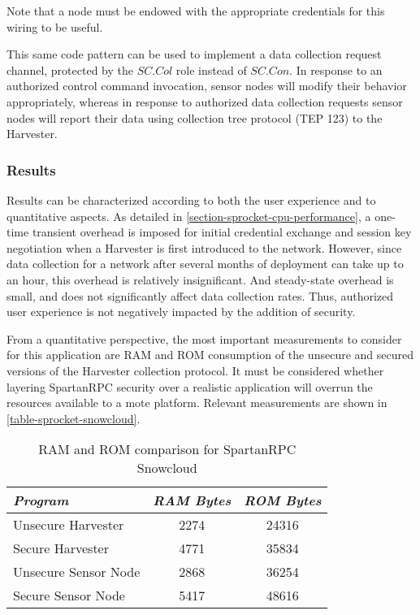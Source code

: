 Note that a node must be endowed with the appropriate credentials for this wiring to be useful.

This same code pattern can be used to implement a data collection request channel, protected by
the $\mathit{SC.Col}$ role instead of $\mathit{SC.Con}$. In response to an authorized control
command invocation, sensor nodes will modify their behavior appropriately, whereas in response
to authorized data collection requests sensor nodes will report their data using collection tree
protocol (TEP 123) to the Harvester.

\subsubsection{Results}

Results can be characterized according to both the user experience and to quantitative aspects.
As detailed in \autoref{section-sprocket-cpu-performance}, a one-time transient overhead is
imposed for initial credential exchange and session key negotiation when a Harvester is first
introduced to the network. However, since data collection for a network after several months of
deployment can take up to an hour, this overhead is relatively insignificant. And steady-state
overhead is small, and does not significantly affect data collection rates. Thus, authorized
user experience is not negatively impacted by the addition of security.

From a quantitative perspective, the most important measurements to consider for this
application are RAM and ROM consumption of the unsecure and secured versions of the Harvester
collection protocol. It must be considered whether layering SpartanRPC security over a realistic
application will overrun the resources available to a mote platform. Relevant measurements are
shown in \autoref{table-sprocket-snowcloud}.

\begin{table}[h]
\centering \newcommand\T{\rule{0pt}{2.1ex}}
\caption{RAM and ROM comparison for SpartanRPC Snowcloud} {
\begin{tabular}{|l|c|c|}
\hline
\emph{Program} \T       & \emph{RAM Bytes} & \emph{ROM Bytes} \\ \hline\hline
Unsecure Harvester \T   &             2274 &            24316 \\ \hline
Secure Harvester \T     &             4771 &            35834 \\ \hline
Unsecure Sensor Node \T &             2868 &            36254 \\ \hline
Secure Sensor Node \T   &             5417 &            48616 \\ \hline
\end{tabular}
}
\label{table-sprocket-snowcloud}
\end{table}

